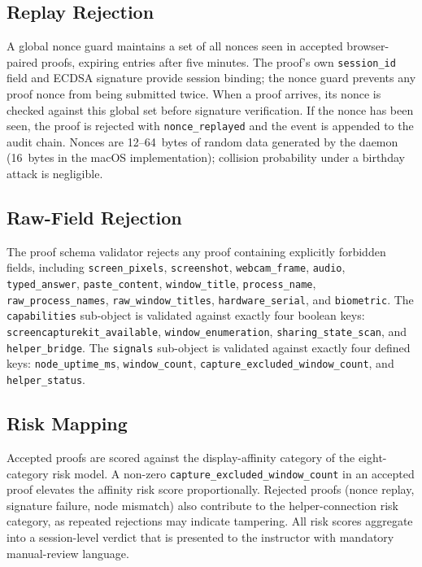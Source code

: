 \documentclass[conference]{IEEEtran}
\begin{document}
\subsection{Replay Rejection}

A global nonce guard maintains a set of all nonces seen in accepted browser-paired proofs, expiring entries after five minutes. The proof's own \texttt{session\_id} field and ECDSA signature provide session binding; the nonce guard prevents any proof nonce from being submitted twice. When a proof arrives, its nonce is checked against this global set before signature verification. If the nonce has been seen, the proof is rejected with \texttt{nonce\_replayed} and the event is appended to the audit chain. Nonces are 12--64~bytes of random data generated by the daemon (16~bytes in the macOS implementation); collision probability under a birthday attack is negligible.

\subsection{Raw-Field Rejection}

The proof schema validator rejects any proof containing explicitly forbidden fields, including \texttt{screen\_pixels}, \texttt{screenshot}, \texttt{webcam\_frame}, \texttt{audio}, \texttt{typed\_answer}, \texttt{paste\_content}, \texttt{window\_title}, \texttt{process\_name}, \texttt{raw\_process\_names}, \texttt{raw\_window\_titles}, \texttt{hardware\_serial}, and \texttt{biometric}. The \texttt{capabilities} sub-object is validated against exactly four boolean keys: \texttt{screencapturekit\_available}, \texttt{window\_enumeration}, \texttt{sharing\_state\_scan}, and \texttt{helper\_bridge}. The \texttt{signals} sub-object is validated against exactly four defined keys: \texttt{node\_uptime\_ms}, \texttt{window\_count}, \texttt{capture\_excluded\_window\_count}, and \texttt{helper\_status}.

\subsection{Risk Mapping}

Accepted proofs are scored against the display-affinity category of the eight-category risk model. A non-zero \texttt{capture\_excluded\_window\_count} in an accepted proof elevates the affinity risk score proportionally. Rejected proofs (nonce replay, signature failure, node mismatch) also contribute to the helper-connection risk category, as repeated rejections may indicate tampering. All risk scores aggregate into a session-level verdict that is presented to the instructor with mandatory manual-review language.
\end{document}
